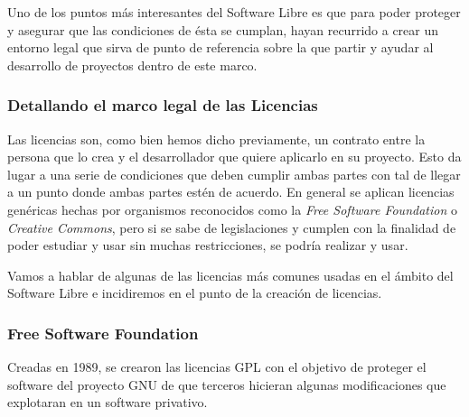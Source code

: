 Uno de los puntos más interesantes del Software Libre es que para poder proteger y asegurar que las condiciones de ésta se cumplan, hayan recurrido a crear un entorno legal que sirva de punto de referencia sobre la que partir y ayudar al desarrollo de proyectos dentro de este marco.

\subsubsection{Detallando el marco legal de las Licencias}
Las licencias son, como bien hemos dicho previamente, un contrato entre la persona que lo crea y el desarrollador que quiere aplicarlo en su proyecto. Esto da lugar a una serie de condiciones que deben cumplir ambas partes con tal de llegar a un punto donde ambas partes estén de acuerdo. En general se aplican licencias genéricas hechas por organismos reconocidos como la \textit{Free Software Foundation} o \textit{Creative Commons}, pero si se sabe de legislaciones y cumplen con la finalidad de poder estudiar y usar sin muchas restricciones, se podría realizar y usar.

Vamos a hablar de algunas de las licencias más comunes usadas en el ámbito del Software Libre e incidiremos en el punto de la creación de licencias.

\subsubsection{Free Software Foundation}
Creadas en 1989, se crearon las licencias GPL con el objetivo de proteger el software del proyecto GNU de que terceros hicieran algunas modificaciones que explotaran en un software privativo.

